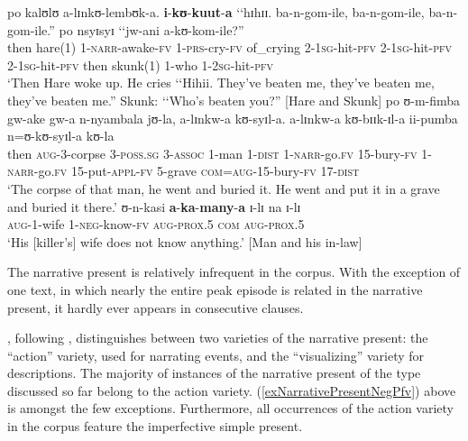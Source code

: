 \begin{exe}
\ex \label{exNarrativePresentPRS}
\gll po kalʊlʊ a-lɪnkʊ-lembʊk-a. \textbf{i}-\textbf{kʊ}-\textbf{kuut}-\textbf{a} \textup{\lq\lq}hɪhɪɪ. ba-n-gom-ile, ba-n-gom-ile, ba-n-gom-ile.\textup{''} po nsyɪsyɪ \textup{\lq\lq}jw-ani a-kʊ-kom-ile?\textup{''}\\
then hare(1) 1-\textsc{narr}-awake-\textsc{fv} 1-\textsc{prs}-cry-\textsc{fv} \phantom{\lq\lq}of\_crying 2-\textsc{1sg}-hit-\textsc{pfv} 2-\textsc{1sg}-hit-\textsc{pfv} 2-\textsc{1sg}-hit-\textsc{pfv} then skunk(1) \phantom{\lq\lq}1-who 1-\textsc{2sg}-hit-\textsc{pfv}\\
\glt \lq Then Hare woke up. He cries \lq\lq Hihii. They've beaten me, they've beaten me, they've beaten me.'' Skunk: \lq\lq Who's beaten you?'' [Hare and Skunk]
\ex \label{exNarrativePresentNegPfv}
\gll po ʊ-m-fimba gw-ake gw-a n-nyambala jʊ-la, a-lɪnkw-a kʊ-syɪl-a. a-lɪnkw-a kʊ-bɪɪk-ɪl-a ii-pumba n=ʊ-kʊ-syɪl-a kʊ-la\\
then \textsc{aug}-3-corpse 3-\textsc{poss.sg} 3-\textsc{assoc} 1-man 1-\textsc{dist} 1-\textsc{narr}-go.\textsc{fv} 15-bury-\textsc{fv} 1-\textsc{narr}-go.\textsc{fv} 15-put-\textsc{appl}-\textsc{fv} 5-grave \textsc{com}=\textsc{aug}-15-bury-\textsc{fv} 17-\textsc{dist}\\
\glt \lq The corpse of that man, he went and buried it. He went and put it in a grave and buried it there.'
\sn \gll ʊ-n-kasi \textbf{a}-\textbf{ka}-\textbf{many}-\textbf{a} ɪ-lɪ na ɪ-lɪ\\
 \textsc{aug}-1-wife 1-\textsc{neg}-know-\textsc{fv} \textsc{aug}-\textsc{prox.5} \textsc{com} \textsc{aug}-\textsc{prox.5}\\
\glt \lq His [killer's] wife does not know anything.' [Man and his in-law] 
\end{exe}

The narrative present is relatively infrequent in the corpus. With the exception of one text, in which nearly the entire peak episode is related in the narrative present, it hardly ever appears in consecutive clauses.

\citet{FleischmanS1990}, following \citet{BuffinJ1925}, distinguishes between two varieties of the narrative present: the ``action'' variety, used for narrating events, and the ``visualizing'' variety for descriptions. The majority of instances of the narrative present of the type discussed so far belong to the action variety. (\ref{exNarrativePresentNegPfv}) above is amongst the few exceptions. Furthermore, all occurrences of the action variety in the corpus feature the imperfective simple present.

